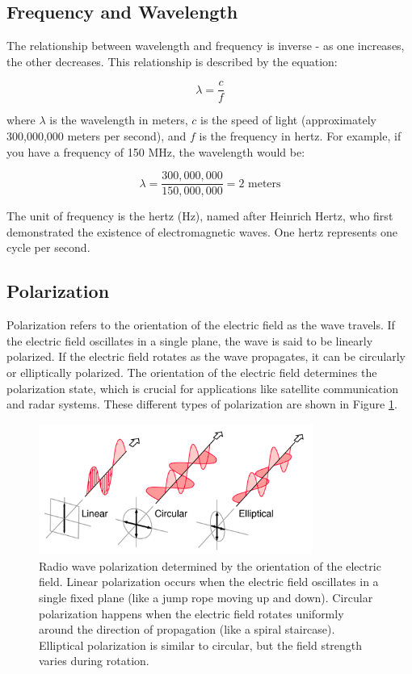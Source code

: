 \subsection{Frequency and Wavelength}
The relationship between wavelength and frequency is inverse - as one increases, the other decreases. This relationship is described by the equation:

\begin{equation}
\lambda = \frac{c}{f}
\label{eq:wavelength}
\end{equation}

where \(\lambda\) is the wavelength in meters, \(c\) is the speed of light (approximately 300,000,000 meters per second), and \(f\) is the frequency in hertz. For example, if you have a frequency of 150 MHz, the wavelength would be:

\[
\lambda = \frac{300,000,000}{150,000,000} = 2 \text{ meters}
\]

The unit of frequency is the hertz (Hz), named after Heinrich Hertz, who first demonstrated the existence of electromagnetic waves. One hertz represents one cycle per second.

\subsection{Polarization}
Polarization refers to the orientation of the electric field as the wave travels. If the electric field oscillates in a single plane, the wave is said to be linearly polarized. If the electric field rotates as the wave propagates, it can be circularly or elliptically polarized. The orientation of the electric field determines the polarization state, which is crucial for applications like satellite communication and radar systems. These different types of polarization are shown in Figure \ref{fig:polarization}.

\begin{figure}[h]
    \centering
    \includegraphics[width=0.8\textwidth]{tech/images/polarization.png}
    \caption{Radio wave polarization determined by the orientation of the electric field. Linear polarization occurs when the electric field oscillates in a single fixed plane (like a jump rope moving up and down). Circular polarization happens when the electric field rotates uniformly around the direction of propagation (like a spiral staircase). Elliptical polarization is similar to circular, but the field strength varies during rotation.}
    \label{fig:polarization}
\end{figure}

